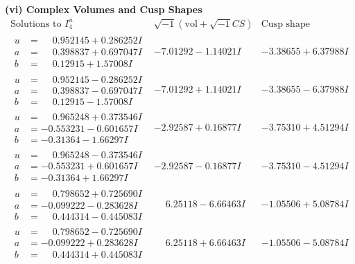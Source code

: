 \documentclass[1p]{elsarticle_modified}
\theoremstyle{definition}
\newcommand{\I}{\sqrt{-1}}
\begin{document}
\newpage\flushleft \textbf{(vi) Complex Volumes and Cusp Shapes}
$$\begin{array}{c|c|c}  
\text{Solutions to }I^u_{4}& \I (\text{vol} + \sqrt{-1}CS) & \text{Cusp shape}\\
 \hline 
\begin{aligned}
u &= \phantom{-}0.952145 + 0.286252 I \\
a &= \phantom{-}0.398837 + 0.697047 I \\
b &= \phantom{-}0.12915 + 1.57008 I\end{aligned}
 & -7.01292 - 1.14021 I & -3.38655 + 6.37988 I \\ \hline\begin{aligned}
u &= \phantom{-}0.952145 - 0.286252 I \\
a &= \phantom{-}0.398837 - 0.697047 I \\
b &= \phantom{-}0.12915 - 1.57008 I\end{aligned}
 & -7.01292 + 1.14021 I & -3.38655 - 6.37988 I \\ \hline\begin{aligned}
u &= \phantom{-}0.965248 + 0.373546 I \\
a &= -0.553231 - 0.601657 I \\
b &= -0.31364 - 1.66297 I\end{aligned}
 & -2.92587 + 0.16877 I & -3.75310 + 4.51294 I \\ \hline\begin{aligned}
u &= \phantom{-}0.965248 - 0.373546 I \\
a &= -0.553231 + 0.601657 I \\
b &= -0.31364 + 1.66297 I\end{aligned}
 & -2.92587 - 0.16877 I & -3.75310 - 4.51294 I \\ \hline\begin{aligned}
u &= \phantom{-}0.798652 + 0.725690 I \\
a &= -0.099222 - 0.283628 I \\
b &= \phantom{-}0.444314 - 0.445083 I\end{aligned}
 & \phantom{-}6.25118 - 6.66463 I & -1.05506 + 5.08784 I \\ \hline\begin{aligned}
u &= \phantom{-}0.798652 - 0.725690 I \\
a &= -0.099222 + 0.283628 I \\
b &= \phantom{-}0.444314 + 0.445083 I\end{aligned}
 & \phantom{-}6.25118 + 6.66463 I & -1.05506 - 5.08784 I \\ \hline\begin{aligned}

\end{aligned}
\end{array}$$
\end{document}

